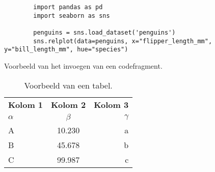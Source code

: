 
\chapter{}%
\label{ch:methodologie}


\begin{listing}
    \begin{verbatim}
        import pandas as pd
        import seaborn as sns
        
        penguins = sns.load_dataset('penguins')
        sns.relplot(data=penguins, x="flipper_length_mm", y="bill_length_mm", hue="species")
    \end{verbatim}
    \caption[Voorbeeld codefragment]{Voorbeeld van het invoegen van een codefragment.}
\end{listing}

\begin{table}
    \centering
    \begin{tabular}{lcr}
        \toprule
        \textbf{Kolom 1} & \textbf{Kolom 2} & \textbf{Kolom 3} \\
        $\alpha$         & $\beta$          & $\gamma$         \\
        \midrule
        A                & 10.230           & a                \\
        B                & 45.678           & b                \\
        C                & 99.987           & c                \\
        \bottomrule
    \end{tabular}
    \caption[Voorbeeld tabel]{\label{tab:example}Voorbeeld van een tabel.}
\end{table}

\lipsum[21-25]
